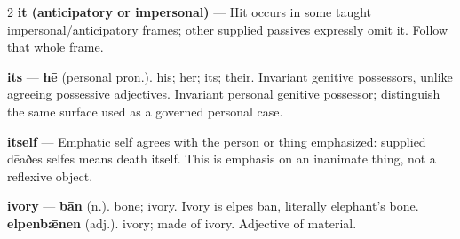 \begin{multicols}{2}
\textbf{it (anticipatory or impersonal)} — Hit occurs in some taught impersonal/anticipatory frames; other supplied passives expressly omit it. Follow that whole frame.\par
\textbf{its} — \textbf{hē} (personal pron.). his; her; its; their. Invariant genitive possessors, unlike agreeing possessive adjectives. Invariant personal genitive possessor; distinguish the same surface used as a governed personal case.\par
\textbf{itself} — Emphatic self agrees with the person or thing emphasized: supplied dēaðes selfes means death itself. This is emphasis on an inanimate thing, not a reflexive object.\par
\textbf{ivory} — \textbf{bān} (n.). bone; ivory. Ivory is elpes bān, literally elephant's bone. \textbf{elpenbǣnen} (adj.). ivory; made of ivory. Adjective of material.\par

\end{multicols}
